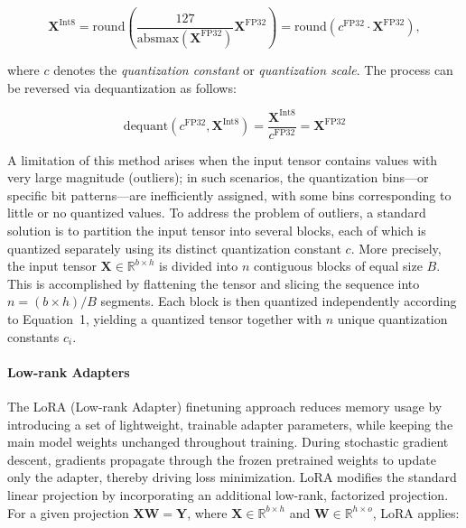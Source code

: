 \begin{equation}
    \mathbf{X}^{ \text{Int8}} = \text{round}\left( \frac{127}{{\text{absmax}}(\mathbf{X}^{{\text{FP32}}})}\mathbf{X}^{{\text{FP32}}} \right) = \text{round}(c^{\text{FP32}}\cdot \mathbf{X}^{{\text{FP32}}}),
\end{equation}

where $c$ denotes the {\em quantization constant} or {\em quantization scale}. The process can be reversed via dequantization as follows:

\begin{equation}
    \text{dequant}(c^{\text{FP32}}, \mathbf{X}^{\text{Int8}}) = \frac{\mathbf{X}^{\text{Int8}}}{c^{\text{FP32}}} = \mathbf{X}^{\text{FP32}}
\end{equation}

A limitation of this method arises when the input tensor contains values with very large magnitude (outliers); in such scenarios, the quantization bins—or specific bit patterns—are inefficiently assigned, with some bins corresponding to little or no quantized values. To address the problem of outliers, a standard solution is to partition the input tensor into several blocks, each of which is quantized separately using its distinct quantization constant $c$. More precisely, the input tensor $\mathbf{X}\in \mathbb{R}^{b\times h}$ is divided into $n$ contiguous blocks of equal size $B$. This is accomplished by flattening the tensor and slicing the sequence into ${n = ({b\times h} )/{B} }$ segments. Each block is then quantized independently according to Equation~1, yielding a quantized tensor together with $n$ unique quantization constants $c_i$.

\paragraph{Low-rank Adapters} The LoRA (Low-rank Adapter) finetuning approach \citep{hu2021lora} reduces memory usage by introducing a set of lightweight, trainable adapter parameters, while keeping the main model weights unchanged throughout training. During stochastic gradient descent, gradients propagate through the frozen pretrained weights to update only the adapter, thereby driving loss minimization. LoRA modifies the standard linear projection by incorporating an additional low-rank, factorized projection. For a given projection ${\mathbf{X} \mathbf{W} = \mathbf{Y}}$, where $\mathbf{X}\in  \mathbb{R}^{b\times h}$ and $\mathbf{W}\in  \mathbb{R}^{h\times o}$, LoRA applies:

